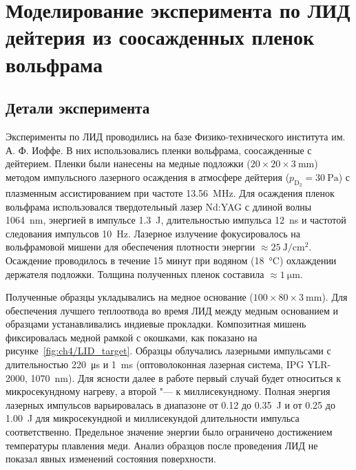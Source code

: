 \section{Моделирование эксперимента по ЛИД дейтерия из соосажденных пленок вольфрама}\label{sec:ch4/sec1}

\subsection{Детали эксперимента}\label{subsec:ch4/sec1/subsec1}

Эксперименты по ЛИД проводились на базе Физико-технического института им. А. Ф. Иоффе. В них использовались пленки вольфрама, соосажденные с дейтерием. Пленки были нанесены на медные подложки ($20 \times 20 \times \SI{3}{\milli\metre}$) методом импульсного лазерного осаждения в атмосфере дейтерия (\(p_\mathrm{D_2}=\SI{30}{\pascal}\)) с плазменным ассистированием при частоте \SI{13.56}{\mega\hertz}. Для осаждения пленок вольфрама использовался твердотельный лазер Nd:YAG с длиной волны \SI{1064}{\nano\meter}, энергией в импульсе \SI{1.3}{\joule}, длительностью импульса \SI{12}{\nano\second} и частотой следования импульсов \SI{10}{\hertz}. Лазерное излучение фокусировалось на вольфрамовой мишени для обеспечения плотности энергии $\approx\SI{25}{\joule\per\centi\meter\squared}$. Осаждение проводилось в течение 15 минут при водяном (\SI{18}{\degreeCelsius}) охлаждении держателя подложки. Толщина полученных пленок составила $\approx\SI{1}{\micro\metre}$.

Полученные образцы укладывались на медное основание ($100 \times 80 \times \SI{3}{\milli\metre}$). Для обеспечения лучшего теплоотвода во время ЛИД между медным основанием и образцами устанавливались индиевые прокладки. Композитная мишень фиксировалась медной рамкой с окошками, как показано на рисунке~\cref{fig:ch4/LID_target}. Образцы облучались лазерными импульсами с длительностью \SI{220}{\micro\second} и \SI{1}{\milli\second} (оптоволоконная лазерная система, IPG YLR-2000, \SI{1070}{\nano\metre}). Для ясности далее в работе первый случай будет относиться к микросекундному нагреву, а второй "--- к миллисекундному. Полная энергия лазерных импульсов варьировалась в диапазоне от \num{0.12} до \SI{0.35}{\joule} и от \num{0.25} до \SI{1.00}{\joule} для микросекундной и миллисекундой длительности импульса соответственно. Предельное значение энергии было ограничено достижением температуры плавления меди. Анализ образцов после проведения ЛИД не показал явных изменений состояния поверхности.

